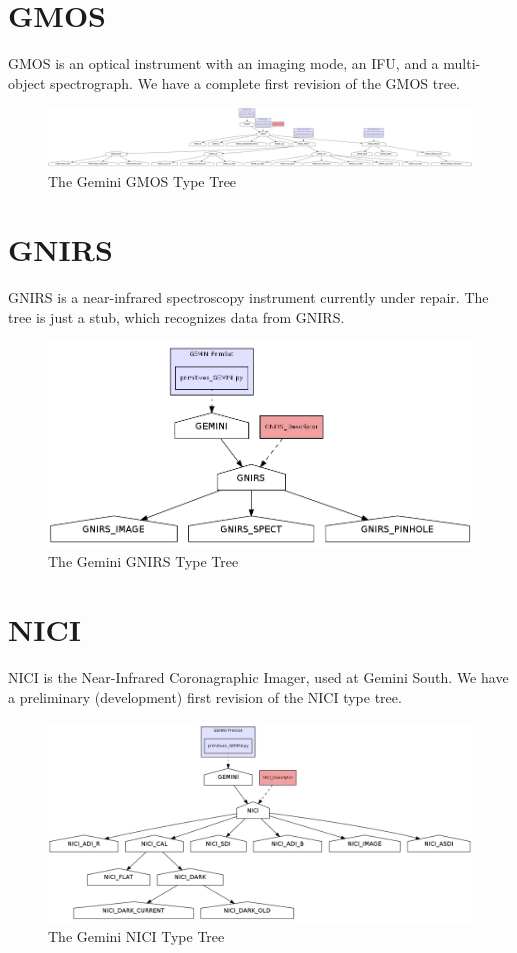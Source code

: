 \documentclass[letterpaper,10pt,english]{sphinxmanual}
\begin{document}
\section{GMOS}
\label{appendix_typegraphs:gmos}
GMOS is an optical instrument with an imaging mode, an IFU, and a multi-object
spectrograph. We have a complete first revision of the GMOS tree.
\begin{figure}[htbp]
\centering
\capstart

\includegraphics[width=0.900\linewidth]{GMOS-tree-pd.png}
\caption{The Gemini GMOS Type Tree}\end{figure}


\section{GNIRS}
\label{appendix_typegraphs:gnirs}
GNIRS is a near-infrared spectroscopy instrument currently under repair. The
tree is just a stub, which recognizes data from GNIRS.
\begin{figure}[htbp]
\centering
\capstart

\includegraphics[width=0.200\linewidth]{GNIRS-tree-pd.png}
\caption{The Gemini GNIRS Type Tree}\end{figure}


\section{NICI}
\label{appendix_typegraphs:nici}
NICI is the Near-Infrared Coronagraphic Imager, used at Gemini South. We have a
preliminary (development) first revision of the NICI type tree.
\begin{figure}[htbp]
\centering
\capstart

\includegraphics[width=0.750\linewidth]{NICI-tree-pd.png}
\caption{The Gemini NICI Type Tree}\end{figure}
\end{document}
